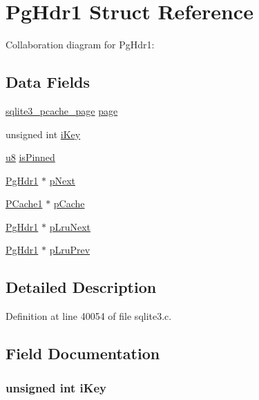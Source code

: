 \hypertarget{struct_pg_hdr1}{}\section{Pg\+Hdr1 Struct Reference}
\label{struct_pg_hdr1}


Collaboration diagram for Pg\+Hdr1\+:
\subsection*{Data Fields}
\begin{DoxyCompactItemize}
\item 
\hyperlink{structsqlite3__pcache__page}{sqlite3\+\_\+pcache\+\_\+page} \hyperlink{struct_pg_hdr1_a6f0f11d1a7d4358de3be5a1a690ed6d6}{page}
\item 
unsigned int \hyperlink{struct_pg_hdr1_ae711d29f32ddc7bf603f2f4b0dc3f2ff}{i\+Key}
\item 
\hyperlink{sqlite3_8c_a74a0f6424ae628af25f23f0a35f6ead3}{u8} \hyperlink{struct_pg_hdr1_a5b62b1cdb700ec6a30076588c35dd39d}{is\+Pinned}
\item 
\hyperlink{struct_pg_hdr1}{Pg\+Hdr1} $\ast$ \hyperlink{struct_pg_hdr1_ad77a4bf60faacf9effe28c843582bf51}{p\+Next}
\item 
\hyperlink{struct_p_cache1}{P\+Cache1} $\ast$ \hyperlink{struct_pg_hdr1_a1daf71224c0c5b8e31d57a6db8d626fd}{p\+Cache}
\item 
\hyperlink{struct_pg_hdr1}{Pg\+Hdr1} $\ast$ \hyperlink{struct_pg_hdr1_ad9f6fb882c1329a87f97f54e70ebeb8a}{p\+Lru\+Next}
\item 
\hyperlink{struct_pg_hdr1}{Pg\+Hdr1} $\ast$ \hyperlink{struct_pg_hdr1_ab5b315b564cf7865933552b7cb0ab73a}{p\+Lru\+Prev}
\end{DoxyCompactItemize}


\subsection{Detailed Description}


Definition at line 40054 of file sqlite3.\+c.



\subsection{Field Documentation}
\hypertarget{struct_pg_hdr1_ae711d29f32ddc7bf603f2f4b0dc3f2ff}{}
\subsubsection[{i\+Key}]{\setlength{\rightskip}{0pt plus 5cm}unsigned int i\+Key}\label{struct_pg_hdr1_ae711d29f32ddc7bf603f2f4b0dc3f2ff}


